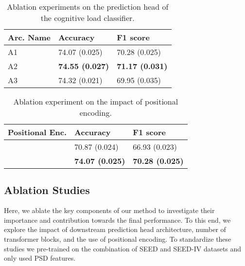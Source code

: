 \documentclass[sigconf]{acmart}
\newcommand{\cmark}{\ding{51}}%
\newcommand{\xmark}{\ding{55}}%
\begin{document}
\begin{table}[t]
        \caption{Ablation experiments on the prediction head of the cognitive load classifier.} 
        \label{table:predHeadAbl} 
        \small
        \begin{center}{
                \begin{tabular}{lll}
                 \hline
                 Arc. Name & Accuracy & F1 score  \\
                 \hline\hline
                 A1  & 74.07 (0.025) & 70.28 (0.025) \\
                 A2 & \textbf{74.55 (0.027)} & \textbf{71.17 (0.031)} \\
                 A3  & 74.32 (0.021) & 69.95 (0.035) \\
                 \hline
                \end{tabular} 
                }
        \end{center}
\end{table}



\begin{table}[t]
        \caption{Ablation experiment on the impact of positional encoding.} 
        \label{table:positional}
        \small
        \begin{center}{
        \begin{tabular}{lll}
        \hline
        Positional Enc. & Accuracy & F1 score  \\
        \hline\hline
        \cmark  & 70.87 (0.024) & 66.93 (0.023) \\
        \xmark & \textbf{74.07 (0.025)} & \textbf{70.28 (0.025)} \\
        \hline
        \end{tabular} 
        }
        \end{center}
\end{table}

\subsection{Ablation Studies}\label{Ablation} 

Here, we ablate the key components of our method to investigate their importance and contribution towards the final performance. To this end, we explore the impact of downstream prediction head architecture, number of transformer blocks, and the use of positional encoding. To standardize these studies we pre-trained on the combination of SEED and SEED-IV datasets and only used PSD features.
\end{document}

